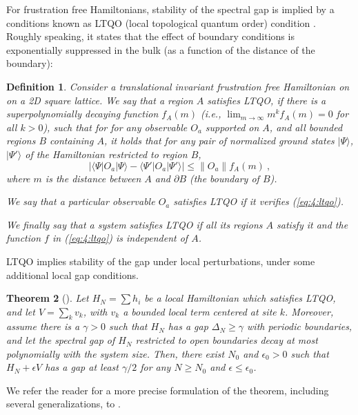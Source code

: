 \documentclass[rmp,aps,reprint,superscriptaddress,nobalancelastpage]{revtex4-1}
\newtheorem{thm}{Theorem}[section]
\newtheorem{defn}[thm]{Definition}
\newcommand{\ket}[1]{\vert#1\rangle}
\begin{document}
    For frustration free Hamiltonians, stability of the spectral gap is implied by a conditions known as LTQO (local topological quantum order) condition \cite{bravyi:tqo-long,bravyi:local-tqo-simple,michalakis:local-tqo-ffree}.
    Roughly speaking, it states that the effect of boundary conditions is exponentially suppressed in the bulk (as a function of the distance of the boundary):

    \begin{defn}
        Consider a translational invariant frustration free Hamiltonian on on a 2D square lattice.  We say that a \emph{region $A$ satisfies LTQO},
        if there is a superpolynomially decaying function $f_A(m)$ (i.e.,
        $\lim_{m\rightarrow\infty}m^kf_A(m) = 0$ for all $k>0$), such that for
        for any observable $O_a$ supported on $A$, and all bounded regions
        $B$ containing $A$,
        it holds that for any pair of normalized ground states $\ket{\Psi}$, $\ket{\Psi'}$ of the Hamiltonian restricted to region $B$,
        \begin{equation}
            \label{eq:4:ltqo}
            \Big|\langle \Psi | O_a |\Psi\rangle
            -\langle \Psi'|O_a|\Psi'\rangle
            \Big| \le \|O_a\| f_A(m)\ ,
        \end{equation}
        where $m$ is the distance between $A$ and $\partial B$ (the boundary of $B$).

        We say that a particular \emph{observable $O_a$ satisfies LTQO} if it verifies (\ref{eq:4:ltqo}).

        We finally say that a \emph{system satisfies LTQO} if all its regions $A$ satisfy it and the function $f$ in (\ref{eq:4:ltqo}) is independent of $A$.
    \end{defn}

    LTQO implies stability of the gap under local perturbations, under some additional local gap conditions.
    \begin{thm}[\textcite{michalakis:local-tqo-ffree}]
        \label{thm:Spiros-stability}
        Let $H_N=\sum h_i$ be a local Hamiltonian which satisfies LTQO, and let $V=\sum_{k} v_k$, with $v_k$ a bounded local term centered at site $k$. Moreover, assume there is a $\gamma>0$ such that $H_N$ has a gap $\Delta_N\ge \gamma$ with periodic boundaries, and let the spectral gap of $H_N$ restricted to open boundaries decay at most polynomially with the system size. Then, there exist $N_0$ and $\epsilon_0>0$ such that $H_N+\epsilon V$ has a gap at least $\gamma/2$ for any $N\ge N_0$ and $\epsilon\le \epsilon_0$.
    \end{thm}
    We refer the reader for a more precise formulation of the theorem, including several generalizations, to \textcite{michalakis:local-tqo-ffree,nachtergaele2020quasi}.
\end{document}
